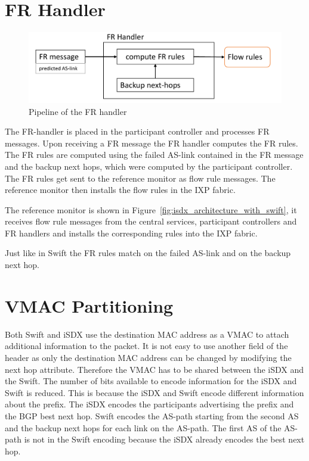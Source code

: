 \section{\label{chapter4:FR-handler}FR Handler}

\begin{figure}[h]
\center
\includegraphics[scale = 0.6]{Figures/design_fr_handler_cropped.pdf}
\caption{Pipeline of the FR handler}
\end{figure}

The FR-handler is placed in the participant controller and processes FR messages.
Upon receiving a FR message the FR handler computes the FR rules. The FR rules are computed using the failed AS-link contained in the FR message and the backup next hops, which were computed by the participant controller. 
The FR rules get sent to the reference monitor as flow rule messages. The reference monitor then installs the flow rules in the IXP fabric.

The reference monitor is shown in Figure~\ref{fig:isdx_architecture_with_swift}, it receives flow rule messages from the central services, participant controllers and FR handlers and installs the corresponding rules into the IXP fabric. 

Just like in Swift the FR rules match on the failed AS-link and on the backup next hop.    

\newpage

\section{\label{chapter4:vmac_partitioning}VMAC Partitioning}

Both Swift and iSDX use the destination MAC address as a VMAC to attach additional information to the packet. It is not easy to use another field of the header as only the destination MAC address can be changed by modifying the next hop attribute. Therefore the VMAC has to be shared between the iSDX and the Swift. The number of bits available to encode information for the iSDX and Swift is reduced. This is because the iSDX and Swift encode different information about the prefix. The iSDX encodes the participants advertising the prefix and the BGP best next hop. Swift encodes the AS-path starting from the second AS and the backup next hops for each link on the AS-path. The first AS of the AS-path is not in the Swift encoding because the iSDX already encodes the best next hop. 

